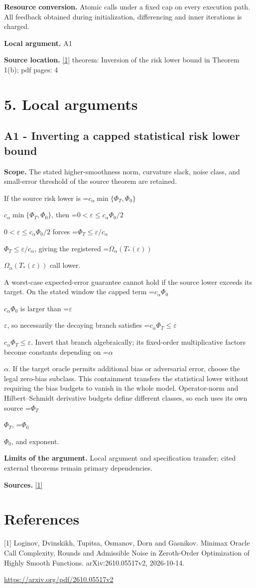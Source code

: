 \documentclass[10pt,a4paper]{article}
\newcommand{\AtlasMath}[1]{\par\begingroup\centering\setbox0=\hbox{$\displaystyle #1$}\ifdim\wd0>1.4\linewidth\typeout{ATLAS WIDE FORMULA: \the\wd0}\fi\ifdim\wd0>\linewidth\resizebox{\linewidth}{!}{\box0}\else\box0\fi\par\endgroup}
\newcommand{\AtlasInlineMath}[1]{\begingroup\setbox0=\hbox{$#1$}\ifdim\wd0>.4\linewidth\endgroup\AtlasMath{#1}\else\endgroup$#1$\fi}
\begin{document}
\textbf{Resource conversion.} Atomic calls under a fixed cap on every execution path. All feedback obtained during initialization, differencing and inner iterations is charged.

\textbf{Local argument.} A1

\textbf{Source location.} \href{https://arxiv.org/pdf/2610.05517v2}{[1]} theorem: Inversion of the risk lower bound in Theorem 1(b); pdf pages: 4

\section{5. Local arguments}
\subsection{A1 - Inverting a capped statistical risk lower bound}
\textbf{Scope.} The stated higher-smoothness norm, curvature slack, noise class, and small-error threshold of the source theorem are retained.

If the source risk lower is \AtlasInlineMath{c_\alpha\min\{\Phi_T,\Phi_0\}}, then \AtlasInlineMath{0<\varepsilon\le c_\alpha\Phi_0/2} forces \AtlasInlineMath{\Phi_T\le\varepsilon/c_\alpha}, giving the registered \AtlasInlineMath{\Omega_\alpha(T_*(\varepsilon))} call lower.

A worst-case expected-error guarantee cannot hold if the source lower exceeds its target. On the stated window the capped term \AtlasInlineMath{c_\alpha\Phi_0} is larger than \AtlasInlineMath{\varepsilon}, so necessarily the decaying branch satisfies \AtlasInlineMath{c_\alpha\Phi_T\le\varepsilon}. Invert that branch algebraically; its fixed-order multiplicative factors become constants depending on \AtlasInlineMath{\alpha}. If the target oracle permits additional bias or adversarial error, choose the legal zero-bias subclass. This containment transfers the statistical lower without requiring the bias budgets to vanish in the whole model. Operator-norm and Hilbert--Schmidt derivative budgets define different classes, so each uses its own source \AtlasInlineMath{\Phi_T}, \AtlasInlineMath{\Phi_0}, and exponent.

\textbf{Limits of the argument.} Local argument and specification transfer; cited external theorems remain primary dependencies.

\textbf{Sources.} \href{https://arxiv.org/pdf/2610.05517v2}{[1]}

\section{References}
[1] Loginov, Dvinskikh, Tupitsa, Osmanov, Dorn and Gasnikov. Minimax Oracle Call Complexity, Rounds and Admissible Noise in Zeroth-Order Optimization of Highly Smooth Functions. arXiv:2610.05517v2, 2026-10-14.

\url{https://arxiv.org/pdf/2610.05517v2}
\end{document}
